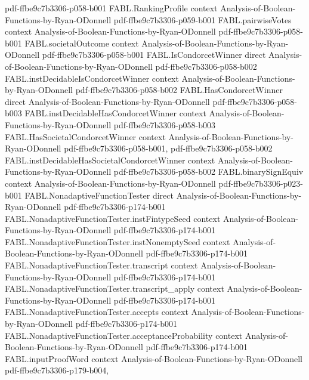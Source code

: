\begin{theorem}
  {pdf-ffbe9c7b3306-p058-b001}
\proofstep
  {FABL.RankingProfile}
  {context}
  {Analysis-of-Boolean-Functions-by-Ryan-ODonnell}
  {pdf-ffbe9c7b3306-p059-b001}
\proofstep
  {FABL.pairwiseVotes}
  {context}
  {Analysis-of-Boolean-Functions-by-Ryan-ODonnell}
  {pdf-ffbe9c7b3306-p058-b001}
\proofstep
  {FABL.societalOutcome}
  {context}
  {Analysis-of-Boolean-Functions-by-Ryan-ODonnell}
  {pdf-ffbe9c7b3306-p058-b001}
\proofstep
  {FABL.IsCondorcetWinner}
  {direct}
  {Analysis-of-Boolean-Functions-by-Ryan-ODonnell}
  {pdf-ffbe9c7b3306-p058-b002}
\proofstep
  {FABL.instDecidableIsCondorcetWinner}
  {context}
  {Analysis-of-Boolean-Functions-by-Ryan-ODonnell}
  {pdf-ffbe9c7b3306-p058-b002}
\proofstep
  {FABL.HasCondorcetWinner}
  {direct}
  {Analysis-of-Boolean-Functions-by-Ryan-ODonnell}
  {pdf-ffbe9c7b3306-p058-b003}
\proofstep
  {FABL.instDecidableHasCondorcetWinner}
  {context}
  {Analysis-of-Boolean-Functions-by-Ryan-ODonnell}
  {pdf-ffbe9c7b3306-p058-b003}
\proofstep
  {FABL.HasSocietalCondorcetWinner}
  {context}
  {Analysis-of-Boolean-Functions-by-Ryan-ODonnell}
  {pdf-ffbe9c7b3306-p058-b001,
    pdf-ffbe9c7b3306-p058-b002}
\proofstep
  {FABL.instDecidableHasSocietalCondorcetWinner}
  {context}
  {Analysis-of-Boolean-Functions-by-Ryan-ODonnell}
  {pdf-ffbe9c7b3306-p058-b002}
\proofstep
  {FABL.binarySignEquiv}
  {context}
  {Analysis-of-Boolean-Functions-by-Ryan-ODonnell}
  {pdf-ffbe9c7b3306-p023-b001}
\proofstep
  {FABL.NonadaptiveFunctionTester}
  {direct}
  {Analysis-of-Boolean-Functions-by-Ryan-ODonnell}
  {pdf-ffbe9c7b3306-p174-b001}
\proofstep
  {FABL.NonadaptiveFunctionTester.instFintypeSeed}
  {context}
  {Analysis-of-Boolean-Functions-by-Ryan-ODonnell}
  {pdf-ffbe9c7b3306-p174-b001}
\proofstep
  {FABL.NonadaptiveFunctionTester.instNonemptySeed}
  {context}
  {Analysis-of-Boolean-Functions-by-Ryan-ODonnell}
  {pdf-ffbe9c7b3306-p174-b001}
\proofstep
  {FABL.NonadaptiveFunctionTester.transcript}
  {context}
  {Analysis-of-Boolean-Functions-by-Ryan-ODonnell}
  {pdf-ffbe9c7b3306-p174-b001}
\proofstep
  {FABL.NonadaptiveFunctionTester.transcript_apply}
  {context}
  {Analysis-of-Boolean-Functions-by-Ryan-ODonnell}
  {pdf-ffbe9c7b3306-p174-b001}
\proofstep
  {FABL.NonadaptiveFunctionTester.accepts}
  {context}
  {Analysis-of-Boolean-Functions-by-Ryan-ODonnell}
  {pdf-ffbe9c7b3306-p174-b001}
\proofstep
  {FABL.NonadaptiveFunctionTester.acceptanceProbability}
  {context}
  {Analysis-of-Boolean-Functions-by-Ryan-ODonnell}
  {pdf-ffbe9c7b3306-p174-b001}
\proofstep
  {FABL.inputProofWord}
  {context}
  {Analysis-of-Boolean-Functions-by-Ryan-ODonnell}
  {pdf-ffbe9c7b3306-p179-b004,
}
\end{theorem}
